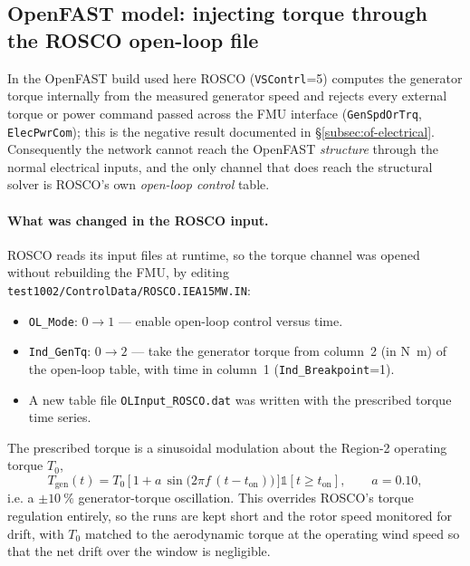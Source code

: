 \subsection{OpenFAST model: injecting torque through the ROSCO open-loop file}
\label{subsec:se-openfast}

In the OpenFAST build used here ROSCO (\texttt{VSContrl}=5) computes the
generator torque internally from the measured generator speed and rejects every
external torque or power command passed across the FMU interface
(\texttt{GenSpdOrTrq}, \texttt{ElecPwrCom}); this is the negative result
documented in \S\ref{subsec:of-electrical}. Consequently the network cannot reach
the OpenFAST \emph{structure} through the normal electrical inputs, and the only
channel that does reach the structural solver is ROSCO's own \emph{open-loop
control} table.

\paragraph{What was changed in the ROSCO input.}
ROSCO reads its input files at runtime, so the torque channel was opened without
rebuilding the FMU, by editing \texttt{test1002/ControlData/ROSCO.IEA15MW.IN}:
\begin{itemize}
  \item \texttt{OL\_Mode}: \(0\to1\) --- enable open-loop control versus time.
  \item \texttt{Ind\_GenTq}: \(0\to2\) --- take the generator torque from column~2
        (in \si{\newton\metre}) of the open-loop table, with time in column~1
        (\texttt{Ind\_Breakpoint}=1).
  \item A new table file \texttt{OLInput\_ROSCO.dat} was written with the
        prescribed torque time series.
\end{itemize}
The prescribed torque is a sinusoidal modulation about the Region-2 operating
torque \(T_0\),
\begin{equation}
  T_{\mathrm{gen}}(t) = T_0\,\big[\,1 + a\,
    \sin\!\big(2\pi f\,(t-t_{\mathrm{on}})\big)\,\big]
    \mathbb{1}[t\ge t_{\mathrm{on}}],\qquad a = 0.10,
  \label{eq:se-ol-forcing}
\end{equation}
i.e. a \(\pm\SI{10}{\percent}\) generator-torque oscillation. This overrides
ROSCO's torque regulation entirely, so the runs are kept short and the rotor
speed monitored for drift, with \(T_0\) matched to the aerodynamic torque at the
operating wind speed so that the net drift over the window is negligible.

